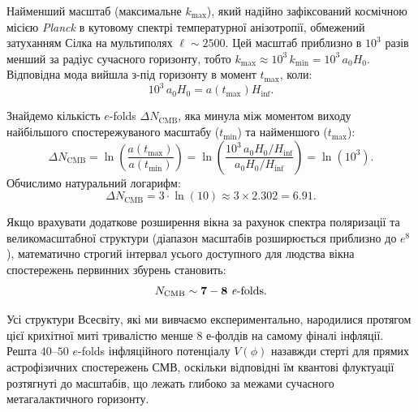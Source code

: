 \documentclass[12pt, a4paper]{article}
\begin{document}
Найменший масштаб (максимальне $k_{\mathrm{max}}$), який надійно зафіксований космічною місією \emph{Planck} в кутовому спектрі температурної анізотропії, обмежений затуханням Сілка на мультиполях $\ell \sim 2500$. Цей масштаб приблизно в $10^3$ разів менший за радіус сучасного горизонту, тобто $k_{\mathrm{max}} \approx 10^3 \, k_{\mathrm{min}} = 10^3 \, a_0 H_0$. Відповідна мода вийшла з-під горизонту в момент $t_{\mathrm{max}}$, коли:
\begin{equation}
10^3 \, a_0 H_0 = a(t_{\mathrm{max}}) H_{\mathrm{inf}}.
\end{equation}

Знайдемо кількість $e$-folds $\Delta N_{\mathrm{CMB}}$, яка минула між моментом виходу найбільшого спостережуваного масштабу ($t_{\mathrm{min}}$) та найменшого ($t_{\mathrm{max}}$):
\begin{equation}
\Delta N_{\mathrm{CMB}} = \ln \left( \frac{a(t_{\mathrm{max}})}{a(t_{\mathrm{min}})} \right) = \ln \left( \frac{10^3 \, a_0 H_0 / H_{\mathrm{inf}}}{a_0 H_0 / H_{\mathrm{inf}}} \right) = \ln(10^3).
\end{equation}
Обчислимо натуральний логарифм:
\begin{equation}
\Delta N_{\mathrm{CMB}} = 3 \cdot \ln(10) \approx 3 \times 2.302 = \mathbf{6.91}.
\end{equation}

Якщо врахувати додаткове розширення вікна за рахунок спектра поляризації та великомасштабної структури (діапазон масштабів розширюється приблизно до $e^8$), математично строгий інтервал усього доступного для людства вікна спостережень первинних збурень становить:
\begin{equation}
N_{\mathrm{CMB}} \sim \mathbf{7 - 8 \text{ \textit{e}-folds}}.
\end{equation}

Усі структури Всесвіту, які ми вивчаємо експериментально, народилися протягом цієї крихітної миті тривалістю менше 8 е-фолдів на самому фіналі інфляції. Решта $40$--$50$ $e$-folds інфляційного потенціалу $V(\phi)$ назавжди стерті для прямих астрофізичних спостережень СМВ, оскільки відповідні їм квантові флуктуації розтягнуті до масштабів, що лежать глибоко за межами сучасного метагалактичного горизонту.

\printbibliography
\end{document}
